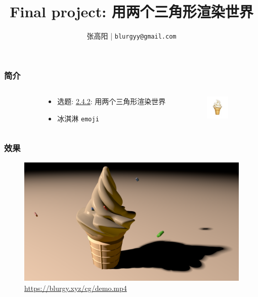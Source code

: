 \documentclass[aspectratio=169]{ctexbeamer} %
\title{Final project: 用两个三角形渲染世界}
\author{张高阳 | \texttt{blurgyy@gmail.com}}
\begin{document}
\begin{frame}
    \titlepage 
\end{frame}

\begin{frame}
    \frametitle{简介}
    \begin{columns}
        \begin{column}{.1\textwidth}\end{column}
        \begin{column}{.5\textwidth}
            \begin{itemize}
                \item 选题: \underline{2.4.2}: 用两个三角形渲染世界
                \item 冰淇淋 \texttt{emoji}
            \end{itemize}
        \end{column}
        \begin{column}{.4\textwidth}
            \includegraphics[width=32pt]{images/pre/emoji.pdf}
        \end{column}
    \end{columns}
\end{frame}

\begin{frame}
    \frametitle{效果}
    \begin{figure}[htbp]
        \centering
        \includegraphics[height=.75\textheight]{images/pre/full.pdf}
        \caption{\url{https://blurgy.xyz/cg/demo.mp4}}
        \label{fig:full}
    \end{figure}
\end{frame}
\end{document}
